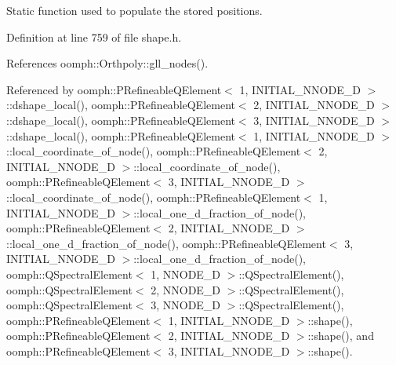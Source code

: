 Static function used to populate the stored positions. 



Definition at line 759 of file shape.\+h.



References oomph\+::\+Orthpoly\+::gll\+\_\+nodes().



Referenced by oomph\+::\+P\+Refineable\+Q\+Element$<$ 1, I\+N\+I\+T\+I\+A\+L\+\_\+\+N\+N\+O\+D\+E\+\_\+D $>$\+::dshape\+\_\+local(), oomph\+::\+P\+Refineable\+Q\+Element$<$ 2, I\+N\+I\+T\+I\+A\+L\+\_\+\+N\+N\+O\+D\+E\+\_\+D $>$\+::dshape\+\_\+local(), oomph\+::\+P\+Refineable\+Q\+Element$<$ 3, I\+N\+I\+T\+I\+A\+L\+\_\+\+N\+N\+O\+D\+E\+\_\+D $>$\+::dshape\+\_\+local(), oomph\+::\+P\+Refineable\+Q\+Element$<$ 1, I\+N\+I\+T\+I\+A\+L\+\_\+\+N\+N\+O\+D\+E\+\_\+D $>$\+::local\+\_\+coordinate\+\_\+of\+\_\+node(), oomph\+::\+P\+Refineable\+Q\+Element$<$ 2, I\+N\+I\+T\+I\+A\+L\+\_\+\+N\+N\+O\+D\+E\+\_\+D $>$\+::local\+\_\+coordinate\+\_\+of\+\_\+node(), oomph\+::\+P\+Refineable\+Q\+Element$<$ 3, I\+N\+I\+T\+I\+A\+L\+\_\+\+N\+N\+O\+D\+E\+\_\+D $>$\+::local\+\_\+coordinate\+\_\+of\+\_\+node(), oomph\+::\+P\+Refineable\+Q\+Element$<$ 1, I\+N\+I\+T\+I\+A\+L\+\_\+\+N\+N\+O\+D\+E\+\_\+D $>$\+::local\+\_\+one\+\_\+d\+\_\+fraction\+\_\+of\+\_\+node(), oomph\+::\+P\+Refineable\+Q\+Element$<$ 2, I\+N\+I\+T\+I\+A\+L\+\_\+\+N\+N\+O\+D\+E\+\_\+D $>$\+::local\+\_\+one\+\_\+d\+\_\+fraction\+\_\+of\+\_\+node(), oomph\+::\+P\+Refineable\+Q\+Element$<$ 3, I\+N\+I\+T\+I\+A\+L\+\_\+\+N\+N\+O\+D\+E\+\_\+D $>$\+::local\+\_\+one\+\_\+d\+\_\+fraction\+\_\+of\+\_\+node(), oomph\+::\+Q\+Spectral\+Element$<$ 1, N\+N\+O\+D\+E\+\_\+D $>$\+::\+Q\+Spectral\+Element(), oomph\+::\+Q\+Spectral\+Element$<$ 2, N\+N\+O\+D\+E\+\_\+D $>$\+::\+Q\+Spectral\+Element(), oomph\+::\+Q\+Spectral\+Element$<$ 3, N\+N\+O\+D\+E\+\_\+D $>$\+::\+Q\+Spectral\+Element(), oomph\+::\+P\+Refineable\+Q\+Element$<$ 1, I\+N\+I\+T\+I\+A\+L\+\_\+\+N\+N\+O\+D\+E\+\_\+D $>$\+::shape(), oomph\+::\+P\+Refineable\+Q\+Element$<$ 2, I\+N\+I\+T\+I\+A\+L\+\_\+\+N\+N\+O\+D\+E\+\_\+D $>$\+::shape(), and oomph\+::\+P\+Refineable\+Q\+Element$<$ 3, I\+N\+I\+T\+I\+A\+L\+\_\+\+N\+N\+O\+D\+E\+\_\+D $>$\+::shape().

\mbox{\label{classoomph_1_1OneDimensionalLegendreShape_a5e68d68ec3373a97a96d8843b6631dba}} 
